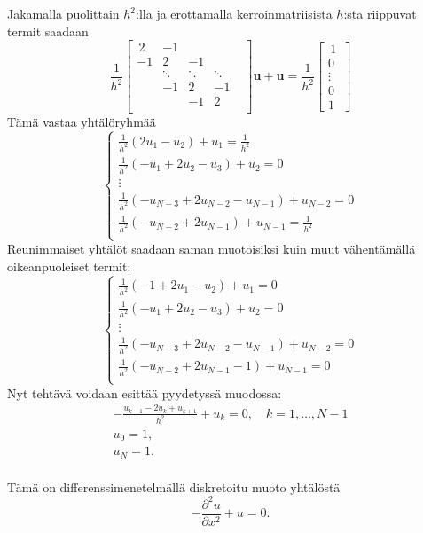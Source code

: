 \documentclass{article}
\begin{document}
Jakamalla puolittain $h^2$:lla ja erottamalla kerroinmatriisista
$h$:sta riippuvat termit saadaan
\[
  \frac{1}{h^2}
  \begin{bmatrix}
    \,2 & -1 & & \,\\
    -1 & 2 & -1 & \\
    & \ddots & \ddots & \ddots & \\
    & -1 & 2 & -1 \\
    & & -1 & 2 \\
  \end{bmatrix}
  \mathbf{u}
  +
  \mathbf{u}
  =
  \frac{1}{h^2}
  \begin{bmatrix}
    \,1\, \\ 0 \\ \vdots \\ 0 \\ 1
  \end{bmatrix}
\]
Tämä vastaa yhtälöryhmää
\[
  \begin{cases}
    \frac{1}{h^2}(2u_1 - u_2) + u_1 = \frac{1}{h^2} \\
    \frac{1}{h^2}(-u_1 + 2u_2 - u_3) + u_2 = 0 \\
    \vdots \\
    \frac{1}{h^2}(-u_{N-3} + 2u_{N-2} - u_{N-1}) + u_{N-2} = 0 \\
    \frac{1}{h^2}(-u_{N-2} + 2u_{N-1}) + u_{N-1} = \frac{1}{h^2} \\
  \end{cases}
\]
Reunimmaiset yhtälöt saadaan saman muotoisiksi kuin muut vähentämällä
oikeanpuoleiset termit:
\[
  \begin{cases}
    \frac{1}{h^2}(-1 + 2u_1 - u_2) + u_1 = 0 \\
    \frac{1}{h^2}(-u_1 + 2u_2 - u_3) + u_2 = 0 \\
    \vdots \\
    \frac{1}{h^2}(-u_{N-3} + 2u_{N-2} - u_{N-1}) + u_{N-2} = 0 \\
    \frac{1}{h^2}(-u_{N-2} + 2u_{N-1} - 1) + u_{N-1} = 0 \\
  \end{cases}
\]
Nyt tehtävä voidaan esittää pyydetyssä muodossa:
\begin{gather*}
  -\frac{u_{k-1} - 2u_k + u_{k+1}}{h^2} + u_k = 0, \quad k = 1,\dots,N-1 \\
  u_0 = 1, \\
  u_N = 1. \\
\end{gather*}

Tämä on differenssimenetelmällä diskretoitu muoto yhtälöstä
\[
  -\frac{\partial^2 u}{\partial x^2} + u = 0.
\]
\end{document}
